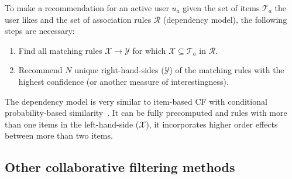 \documentclass[nojss]{jss}
\newcommand{\set}[1]{\mathcal{#1}}
\begin{document}
To make a recommendation for an active user $u_a$ given the
set of items $\set{T}_a$ the user likes and the
set of association rules $\set{R}$ (dependency model),
the following steps are necessary:
\begin{enumerate}
\item Find all matching rules $\set{X} \rightarrow \set{Y}$ for
which $\set{X} \subseteq \set{T}_a$
in $\set{R}$.
\item Recommend $N$ unique right-hand-sides ($\set{Y}$) of the matching rules
with the highest confidence (or another measure of interestingness).
\end{enumerate}

The dependency model is very similar to
item-based CF with conditional probability-based
similarity~\citep{recommender:Deshpande:2004}. It can be fully precomputed
and rules with more than one items in the left-hand-side ($\set{X}$),
it incorporates higher order effects between more than two items.

\subsection{Other collaborative filtering methods}
\end{document}
